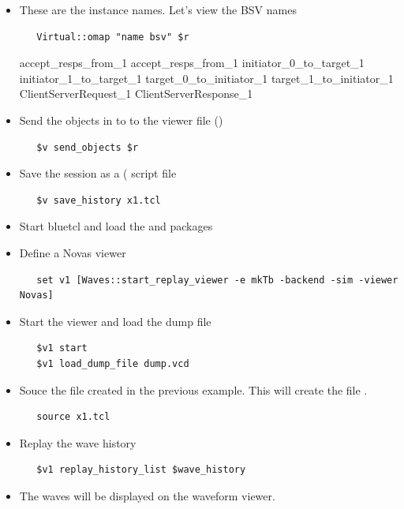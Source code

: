 \begin{itemize}
\item These are the instance names.  Let's view the BSV names
\begin{verbatim}
   Virtual::omap "name bsv" $r
\end{verbatim}

\begin{codebox}
accept_resps_from_1 accept_resps_from_1 initiator_0_to_target_1
initiator_1_to_target_1 target_0_to_initiator_1
target_1_to_initiator_1 ClientServerRequest_1 ClientServerResponse_1 
\end{codebox}

\item Send the objects in  to  to the viewer file  ()
\begin{verbatim}
   $v send_objects $r
\end{verbatim}

\item Save the session as a  ( script file
\begin{verbatim}
   $v save_history x1.tcl
\end{verbatim}
\end{itemize}


\begin{itemize}
\item Start bluetcl and load the  and  packages

\item Define a Novas viewer 

\begin{verbatim}
   set v1 [Waves::start_replay_viewer -e mkTb -backend -sim -viewer Novas]
\end{verbatim}

\item Start the viewer and load the dump file
\begin{verbatim}
   $v1 start
   $v1 load_dump_file dump.vcd
\end{verbatim}

\item Souce the  file created in the previous example.
This will create the file .
\begin{verbatim}
   source x1.tcl
\end{verbatim}

\item Replay the wave history

\begin{verbatim}
   $v1 replay_history_list $wave_history
\end{verbatim}

\item The waves will be displayed on the waveform viewer.

\end{itemize}

